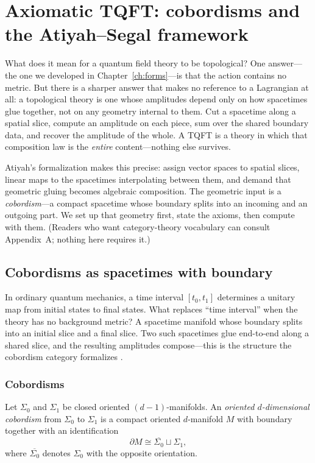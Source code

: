 \chapter{Axiomatic TQFT: cobordisms and the Atiyah--Segal framework}\label{ch:axiomatic}

What does it mean for a quantum field theory to be topological?  One answer---the one we developed in Chapter~\ref{ch:forms}---is that the action contains no metric.  But there is a sharper answer that makes no reference to a Lagrangian at all: a topological theory is one whose amplitudes depend only on how spacetimes glue together, not on any geometry internal to them.  Cut a spacetime along a spatial slice, compute an amplitude on each piece, sum over the shared boundary data, and recover the amplitude of the whole.  A TQFT is a theory in which that composition law is the \emph{entire} content---nothing else survives.

Atiyah's formalization \cite{Atiyah1988TQFT} makes this precise: assign vector spaces to spatial slices, linear maps to the spacetimes interpolating between them, and demand that geometric gluing becomes algebraic composition.  The geometric input is a \emph{cobordism}---a compact spacetime whose boundary splits into an incoming and an outgoing part.  We set up that geometry first, state the axioms, then compute with them.  (Readers who want category-theory vocabulary can consult Appendix~A; nothing here requires it.)

\section{Cobordisms as spacetimes with boundary}\label{sec:cobordism-category}

In ordinary quantum mechanics, a time interval $[t_0, t_1]$ determines a unitary map from initial states to final states.  What replaces ``time interval'' when the theory has no background metric?  A spacetime manifold whose boundary splits into an initial slice and a final slice.  Two such spacetimes glue end-to-end along a shared slice, and the resulting amplitudes compose---this is the structure the cobordism category formalizes \cite{Atiyah1988TQFT,Kock2004Frobenius}.

\subsection{Cobordisms}

\begin{definition}\label{def:oriented-cobordism}
Let $\Sigma_0$ and $\Sigma_1$ be closed oriented $(d-1)$-manifolds. An \emph{oriented $d$-dimensional cobordism} from $\Sigma_0$ to $\Sigma_1$ is a compact oriented $d$-manifold $M$ with boundary together with an identification
\begin{equation}\label{eq:cobordism-boundary}
\partial M \cong \overline{\Sigma_0} \sqcup \Sigma_1,
\end{equation}
where $\overline{\Sigma_0}$ denotes $\Sigma_0$ with the opposite orientation.
\end{definition}


